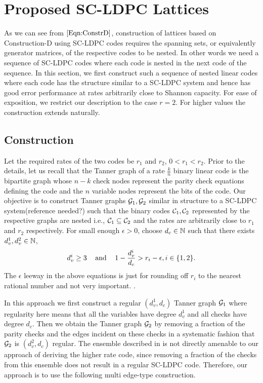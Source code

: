 \section{Proposed SC-LDPC Lattices}\label{Sec:SCLDPC}
As we can see from $\eqref{Eqn:ConstrD}$, construction of lattices based on Construction-D using SC-LDPC codes requires the spanning sets, or equivalently generator matrices, of the respective codes to be nested. In other words we need a sequence of SC-LDPC codes where each code is nested in the next code of the sequence. In this section, we first construct such a sequence of nested linear codes where each code has the structure similar to a SC-LDPC system and hence has good error performance at rates arbitrarily close to Shannon capacity. For ease of exposition, we restrict our description to the case $r=2$. For higher values the construction extends naturally.

\subsection{Construction}
Let the required rates of the two codes be $r_{1}$ and $r_{2}$, $0< r_{1}<r_{2}$. Prior to the details, let us recall that the Tanner graph of a rate $\frac{k}{n}$ binary linear code is the bipartite graph whose $n-k$ check nodes represent the parity check equations defining the code and the $n$ variable nodes represent the bits of the code. Our objective is to construct Tanner graphs $\mathcal{G}_{1},\mathcal{G}_{2}$ similar in structure to a SC-LDPC system(reference needed?) such that the binary codes $\mathcal{C}_{1},\mathcal{C}_{2}$ represented by the respective graphs are nested i.e., $\mathcal{C}_{1}\subseteq \mathcal{C}_{2}$ and the rates are arbitrarily close to $r_{1}$ and $r_{2}$ respectively. For small enough $\epsilon >0$, choose $d_{c}\in\mathbb{N}$ such that there exists $d_{v}^{1},d_{v}^{2}\in \mathbb{N}$,
\begin{align}
	d_{v}^{i}\geq 3 \hspace{0.3cm} \text{  and }  \hspace{0.3cm}  1-\frac{d_{v}^{i}}{d_{c}}>r_{i}-\epsilon, i\in \{1,2\}.
						\label{Eqn:DegreeConditions1}
\end{align}
The $\epsilon$ leeway in the above equations is just for rounding off $r_{i}$ to the nearest rational number and not very important.
.
 \fi

In this approach we first construct a regular $(d_{v}^{1},d_{c})$ Tanner graph $\mathcal{G}_{1}$ where regularity here means that all the variables have degree $d_{v}^{1}$ and all checks have degree $d_{c}$. Then we obtain the Tanner graph $\mathcal{G}_{2}$ by removing a fraction of the parity checks and the edges incident on these checks in a systematic fashion that $\mathcal{G}_{2}$ is $(d_{v}^{2},d_{c})$ regular. The ensemble described in \cite{KudekarUrbanke11} is not directly amenable to our approach of deriving the higher rate code, since removing a fraction of the checks from this ensemble does not result in a regular SC-LDPC code. Therefore, our approach is to use the following multi edge-type construction.

